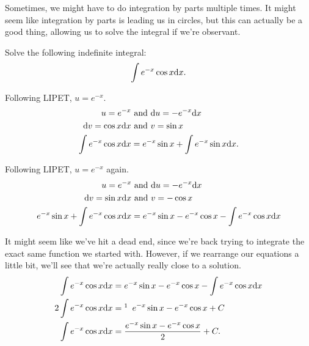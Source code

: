 Sometimes, we might have to do integration by parts multiple times.
It might seem like integration by parts is leading us in circles, but this can actually be a good thing, allowing us to solve the integral if we're observant.
\begin{example}
	Solve the following indefinite integral:
	\begin{equation*}
		\int{e^{-x}\cos{x}\mathrm{d} x}.
	\end{equation*}
\end{example}
\begin{answer}
	Following LIPET, $u=e^{-x}$.
	\begin{align*}
		u = e^{-x} &\text{ and } \mathrm{d} u = -e^{-x}\mathrm{d} x \\
		\mathrm{d} v = \cos{x}\mathrm{d} x &\text{ and } v = \sin{x} \\
		\int{e^{-x}\cos{x}\mathrm{d} x} &= e^{-x}\sin{x} + \int{e^{-x}\sin{x}\mathrm{d} x}.
	\end{align*}
	
	Following LIPET, $u = e^{-x}$ again.
	\begin{align*}
		u = e^{-x} &\text{ and } \mathrm{d} u = -e^{-x}\mathrm{d} x \\
		\mathrm{d} v = \sin{x}\mathrm{d} x &\text{ and } v = -\cos{x} \\
		e^{-x}\sin{x} + \int{e^{-x}\cos{x}\mathrm{d} x} &= e^{-x}\sin{x} - e^{-x}\cos{x} - \int{e^{-x}\cos{x}\mathrm{d} x}
	\end{align*}
	
	It might seem like we've hit a dead end, since we're back trying to integrate the exact same function we started with.
	However, if we rearrange our equations a little bit, we'll see that we're actually really close to a solution.
	\begin{align*}
		\int{e^{-x}\cos{x}\d{x}} &= e^{-x}\sin{x} - e^{-x}\cos{x} - \int{e^{-x}\cos{x}\d{x}} \\
		2\int{e^{-x}\cos{x}\d{x}} &=\footnotemark\hspace{5pt} e^{-x}\sin{x} - e^{-x}\cos{x} + C \\
		\int{e^{-x}\cos{x}\d{x}} &= \frac{e^{-x}\sin{x} - e^{-x}\cos{x}}{2} + C.
	\end{align*}
\end{answer}

